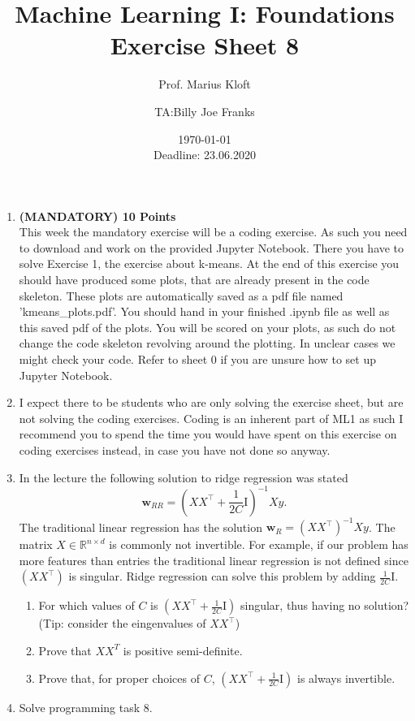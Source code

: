 \documentclass[]{scrartcl}
\author{Prof. Marius Kloft \and TA:Billy Joe Franks}
\title{Machine Learning I: Foundations \\ Exercise Sheet 8}
\date{\today\\Deadline: 23.06.2020}
\newcommand{\R}{\mathbb{R}}
\newcommand{\bw}{\mathbf{w}}
\begin{document}
\maketitle

\begin{enumerate}

\item \textbf{(MANDATORY) 10 Points}\\ This week the mandatory exercise will be a coding exercise. As such you need to download and work on the provided Jupyter Notebook. There you have to solve Exercise 1, the exercise about k-means. At the end of this exercise you should have produced some plots, that are already present in the code skeleton. These plots are automatically saved as a pdf file named 'kmeans\_plots.pdf'. You should hand in your finished .ipynb file as well as this saved pdf of the plots. You will be scored on your plots, as such do not change the code skeleton revolving around the plotting. In unclear cases we might check your code. Refer to sheet 0 if you are unsure how to set up Jupyter Notebook.

\item I expect there to be students who are only solving the exercise sheet, but are not solving the coding exercises. Coding is an inherent part of ML1 as such I recommend you to spend the time you would have spent on this exercise on coding exercises instead, in case you have not done so anyway.

\item In the lecture the following solution to ridge regression was stated
    $$\bw_{RR} = \left(XX^\top + \frac{1}{2C}\text{I}\right)^{-1}X y.$$
The traditional linear regression has the solution $\bw_{R} = (XX^\top)^{-1}X y$. The matrix $X \in \R^{n \times d}$ is commonly not invertible. For example, if our problem has more features than entries the traditional linear regression is not defined since $(XX^\top)$ is singular. Ridge regression can solve this problem by adding $\frac{1}{2C}\text{I}$.
\begin{enumerate}
\item For which values of $C$ is $\left(XX^\top + \frac{1}{2C}\text{I}\right)$ singular, thus having no solution? (Tip: consider the eingenvalues of $XX^\top$)
\item Prove that $XX^T$ is positive semi-definite.
\item Prove that, for proper choices of $C$, $\left(XX^\top + \frac{1}{2C}\text{I}\right)$ is always invertible.
\end{enumerate}

\item Solve programming task 8.
\end{enumerate}
\end{document}
